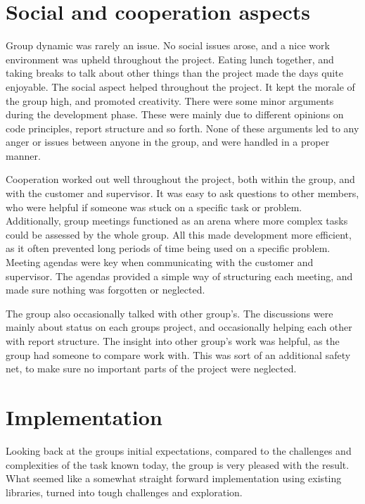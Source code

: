 \section{Social and cooperation aspects}
\label{sec:Social_and_cooperation_aspects}

Group dynamic was rarely an issue. No social issues arose, and a nice work environment was upheld throughout the project. Eating lunch together, and taking breaks to talk about other things than the project made the days quite enjoyable. The social aspect helped throughout the project. It kept the morale of the group high, and promoted creativity. There were some minor arguments during the development phase. These were mainly due to different opinions on code principles, report structure and so forth. None of these arguments led to any anger or issues between anyone in the group, and were handled in a proper manner.

Cooperation worked out well throughout the project, both within the group, and with the customer and supervisor. It was easy to ask questions to other members, who were helpful if someone was stuck on a specific task or problem. Additionally, group meetings functioned as an arena where more complex tasks could be assessed by the whole group. All this made development more efficient, as it often prevented long periods of time being used on a specific problem. Meeting agendas were key when communicating with the customer and supervisor. The agendas provided a simple way of structuring each meeting, and made sure nothing was forgotten or neglected.

The group also occasionally talked with other group's. The discussions were mainly about status on each groups project, and occasionally helping each other with report structure. The insight into other group's work was helpful, as the group had someone to compare work with. This was sort of an additional safety net, to make sure no important parts of the project were neglected.

\section{Implementation}
\label{sec:Implementation}

Looking back at the groups initial expectations, compared to the challenges and complexities of the task known today, the group is very pleased with the result. What seemed like a somewhat straight forward implementation using existing libraries, turned into tough challenges and exploration.

